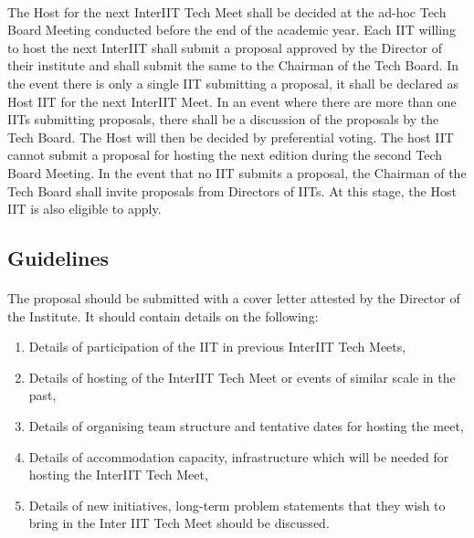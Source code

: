 \paragraph{}
The Host for the next InterIIT Tech Meet shall be decided at the ad-hoc Tech Board Meeting conducted before the end of the academic year. Each IIT willing to host the next InterIIT shall submit a proposal approved by the Director of their institute and shall submit the same to the Chairman of the Tech Board. In the event there is only a single IIT submitting a proposal, it shall be declared as Host IIT for the next InterIIT Meet. In an event where there are more than one IITs submitting proposals, there shall be a discussion of the proposals by the Tech Board. The Host will then be decided by preferential voting. The host IIT cannot submit a proposal for hosting the next edition during the second Tech Board Meeting. In the event that no IIT submits a proposal, the Chairman of the Tech Board shall invite proposals from Directors of IITs. At this stage, the Host IIT is also eligible to apply.

\subsection{Guidelines}
\paragraph{}
The proposal should be submitted with a cover letter attested by the Director of the Institute.
It should contain details on the following:
\begin{enumerate}
    \item Details of participation of the IIT in previous InterIIT Tech Meets,
    \item Details of hosting of the InterIIT Tech Meet or events of similar scale in the past,
    \item Details of organising team structure and tentative dates for hosting the meet,
    \item Details of accommodation capacity, infrastructure which will be needed for hosting the InterIIT Tech Meet,
    \item Details of new initiatives, long-term problem statements that they wish to bring in the Inter IIT Tech Meet should be discussed.
\end{enumerate}
